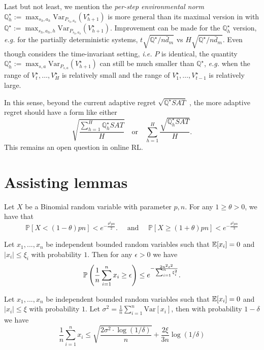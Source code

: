 Last but not least, we mention the \emph{per-step environmental norm} $\mathbb{Q}^\star_h:=\max_{s_h,a_h}\mathrm{Var}_{P_{s_h,a_h}}(V^\star_{h+1})$ is more general than its maximal version in \cite{zanette2019tighter} with $\mathbb{Q}^\star:=\max_{s_h,a_h,h}\mathrm{Var}_{P_{s_h,a_h}}(V^\star_{h+1})$. Improvement can be made for the $\mathbb{Q}^\star_h$ version, \emph{e.g.} for the partially deterministic systems, $t\sqrt{\mathbb{Q}^\star/n\bar{d}_m}$ vs $H\sqrt{\mathbb{Q}^\star/n\bar{d}_m}$. Even though \cite{zanette2019tighter} considers the time-invariant setting, \emph{i.e.} $P$ is identical, the quantity $\mathbb{Q}^\star_h:=\max_{s,a}\mathrm{Var}_{P_{s,a}}(V^\star_{h+1})$ can still be much smaller than $\mathbb{Q}^\star$, \emph{e.g.} when the range of $V^\star_t,\ldots,V^\star_H$ is relatively small and the range of $V^\star_1,\ldots,V^\star_{t-1}$ is relatively large. 

In this sense, beyond the current adaptive regret $\sqrt{\mathbb{Q}^\star SAT}$ \citep{zanette2019tighter}, the more adaptive regret should have a form like either
\[
\sqrt{\frac{\sum_{h=1}^H\mathbb{Q}^\star_h SAT}{H}}\quad \text{or}\quad \sum_{h=1}^H \frac{\sqrt{\mathbb{Q}_h^\star SAT}}{H}.
\]
This remains an open question in online RL.


\section{Assisting lemmas}

\begin{lemma}\label{lem:chernoff_multiplicative}
	Let $X$ be a Binomial random variable with parameter $p,n$. For any $1\geq\theta>0$, we have that 
	$$
	\mathbb{P}[X<(1-\theta) p n]<e^{-\frac{\theta^{2} p n}{2}} . \quad \text { and } \quad \mathbb{P}[X \geq(1+\theta) p n]<e^{-\frac{\theta^{2} p n}{3}}
	$$
\end{lemma}


\begin{lemma}\label{lem:hoeffding_ineq}
	Let $x_1,...,x_n$ be independent bounded random variables such that $\E[x_i]=0$ and $|x_i|\leq \xi_i$ with probability $1$. Then for any $\epsilon >0$ we have 
	$$
	\P\left( \frac{1}{n}\sum_{i=1}^nx_i\geq \epsilon\right) \leq e^{-\frac{2n^2\epsilon^2}{\sum_{i=1}^n\xi_i^2}}.
	$$
\end{lemma}


\begin{lemma}\label{lem:bernstein_ineq}
	Let $x_1,...,x_n$ be independent bounded random variables such that $\E[x_i]=0$ and $|x_i|\leq \xi$ with probability $1$. Let $\sigma^2 = \frac{1}{n}\sum_{i=1}^n \mathrm{Var}[x_i]$, then with probability $1-\delta$ we have 
	$$
	\frac{1}{n}\sum_{i=1}^n x_i\leq \sqrt{\frac{2\sigma^2\cdot\log(1/\delta)}{n}}+\frac{2\xi}{3n}\log(1/\delta)
	$$
\end{lemma}

